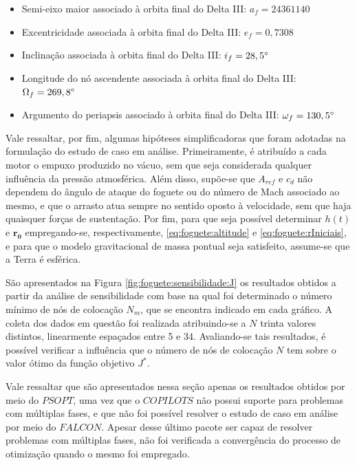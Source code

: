 \begin{itemize}
	\item Semi-eixo maior associado à orbita final do Delta III: $ a_f = 24361140 $ 
	\item Excentricidade associada à orbita final do Delta III: $ e_f = 0,7308 $
	\item Inclinação associada à orbita final do Delta III: $ i_f = 28,5 \degree$ 
	\item Longitude do nó ascendente associada à orbita final do Delta III: $ \Omega_f = 269,8 \degree$
	\item Argumento do periapsis associado à orbita final do Delta III: $ \omega_f = 130,5 \degree$ 
\end{itemize}


Vale ressaltar, por fim, algumas hipóteses simplificadoras que foram adotadas na formulação do estudo de caso em análise. Primeiramente, é atribuído a cada motor o empuxo produzido no vácuo, sem que seja considerada qualquer influência da pressão atmosférica. Além disso, supõe-se que $ A_{ref} $ e $ c_d $ não dependem do ângulo de ataque do foguete ou do número de Mach associado ao mesmo, e que o arrasto atua sempre no sentido oposto à velocidade, sem que haja quaisquer forças de sustentação. Por fim, para que seja possível determinar $ h(t) $ e $ \mathbf{r_0} $ empregando-se, respectivamente, \eqref{eq:foguete:altitude} e \eqref{eq:foguete:rIniciais}, e para que o modelo gravitacional de massa pontual seja satisfeito, assume-se que a Terra é esférica. 


São apresentados na Figura \ref{fig:foguete:sensibilidade:J} os resultados obtidos a partir da análise de sensibilidade com base na qual foi determinado o número mínimo de nós de colocação $ N_m $, que se encontra indicado em cada gráfico. A coleta dos dados em questão foi realizada atribuindo-se a $ N $ trinta valores distintos, linearmente espaçados entre 5 e 34. Avaliando-se tais resultados, é possível verificar a influência que o número de nós de colocação $ N $ tem sobre o valor ótimo da função objetivo $ J^* $. 

Vale ressaltar que são apresentados nessa seção apenas os resultados obtidos por meio do $ PSOPT $, uma vez que o $ COPILOTS $ não possui suporte para problemas com múltiplas fases, e que não foi possível resolver o estudo de caso em análise por meio do $ FALCON $. Apesar desse último pacote ser capaz de resolver problemas com múltiplas fases, não foi verificada a convergência do processo de otimização quando o mesmo foi empregado.

